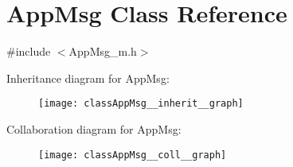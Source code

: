 \hypertarget{classAppMsg}{}\section{App\+Msg Class Reference}
\label{classAppMsg}


{\ttfamily \#include $<$App\+Msg\+\_\+m.\+h$>$}



Inheritance diagram for App\+Msg\+:\nopagebreak
\begin{figure}[H]
\begin{center}
\leavevmode
\texttt{[image: classAppMsg\_\_inherit\_\_graph]}
\end{center}
\end{figure}


Collaboration diagram for App\+Msg\+:\nopagebreak
\begin{figure}[H]
\begin{center}
\leavevmode
\texttt{[image: classAppMsg\_\_coll\_\_graph]}
\end{center}
\end{figure}
